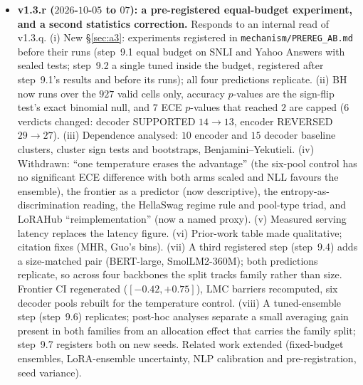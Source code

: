 \documentclass[11pt]{article}
\begin{document}
\begin{itemize}[leftmargin=*]
\item \textbf{v1.3.r ($2026$-$10$-$05$ to $07$): a pre-registered equal-budget experiment, and a second statistics correction.} Responds to an internal read of v1.3.q. (i) New \S\ref{sec:a3}: experiments registered in \texttt{mechanism/\allowbreak PREREG\_AB.md} before their runs (step~9.1 equal budget on SNLI and Yahoo Answers with sealed tests; step~9.2 a single tuned inside the budget, registered after step~9.1's results and before its runs); all four predictions replicate. (ii) BH now runs over the $927$ valid cells only, accuracy $p$-values are the sign-flip test's exact binomial null, and $7$ ECE $p$-values that reached $2$ are capped ($6$ verdicts changed: decoder SUPPORTED $14\to13$, encoder REVERSED $29\to27$). (iii) Dependence analysed: $10$ encoder and $15$ decoder baseline clusters, cluster sign tests and bootstraps, Benjamini--Yekutieli. (iv) Withdrawn: ``one temperature erases the advantage'' (the six-pool control has no significant ECE difference with both arms scaled and NLL favours the ensemble), the frontier as a predictor (now descriptive), the entropy-as-discrimination reading, the HellaSwag regime rule and pool-type triad, and LoRAHub ``reimplementation'' (now a named proxy). (v) Measured serving latency replaces the latency figure. (vi) Prior-work table made qualitative; citation fixes (MHR, Guo's bins). (vii) A third registered step (step~9.4) adds a size-matched pair (BERT-large, SmolLM2-360M); both predictions replicate, so across four backbones the split tracks family rather than size. Frontier CI regenerated ($[{-}0.42,{+}0.75]$), LMC barriers recomputed, six decoder pools rebuilt for the temperature control. (viii) A tuned-ensemble step (step~9.6) replicates; post-hoc analyses separate a small averaging gain present in both families from an allocation effect that carries the family split; step~9.7 registers both on new seeds. Related work extended (fixed-budget ensembles, LoRA-ensemble uncertainty, NLP calibration and pre-registration, seed variance).

\end{itemize}
\end{document}
